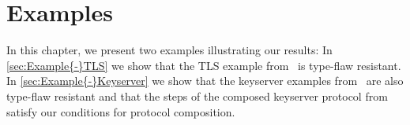 \documentclass[10pt,DIV16,a4paper,abstract=true,twoside=semi,openright]
{scrreprt}
\begin{document}
\chapter{Examples}
\label{cha:examples}
In this chapter, we present two examples illustrating our results:
In \autoref{sec:Example{-}TLS} we show that the TLS example from~\cite{hess.ea:formalizing:2017} is type-flaw resistant.
In \autoref{sec:Example{-}Keyserver} we show that the keyserver examples from~\cite{hess.ea:typing:2018,hess.ea:stateful:2018} are also type-flaw resistant and that the steps of the composed keyserver protocol from~\cite{hess.ea:stateful:2018} satisfy our conditions for protocol composition. 



{\small
  
  
}
\end{document}
